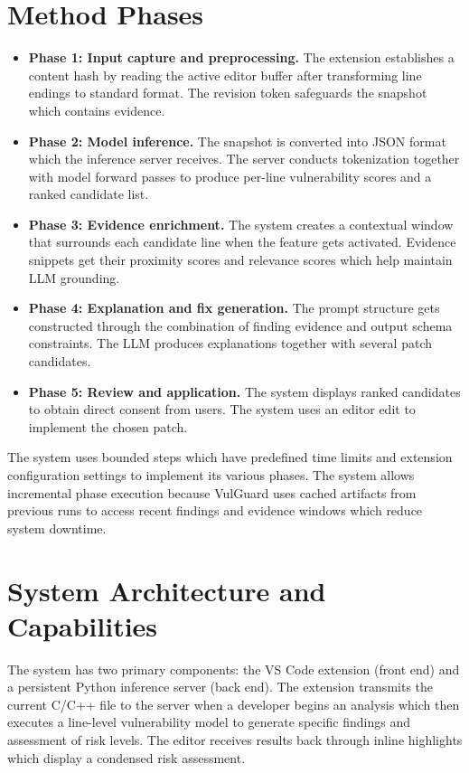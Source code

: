 \section{Method Phases} 
\begin{itemize} 
\item \textbf{Phase 1: Input capture and preprocessing.} The extension establishes a content hash by reading the active editor buffer after transforming line endings to standard format. The revision token safeguards the snapshot which contains evidence.
\item \textbf{Phase 2: Model inference.} The snapshot is converted into JSON format which the inference server receives. The server conducts tokenization together with model forward passes to produce per-line vulnerability scores and a ranked candidate list.
\item \textbf{Phase 3: Evidence enrichment.} The system creates a contextual window that surrounds each candidate line when the feature gets activated. Evidence snippets get their proximity scores and relevance scores which help maintain LLM grounding.
\item \textbf{Phase 4: Explanation and fix generation.} The prompt structure gets constructed through the combination of finding evidence and output schema constraints. The LLM produces explanations together with several patch candidates.
\item \textbf{Phase 5: Review and application.} The system displays ranked candidates to obtain direct consent from users. The system uses an editor edit to implement the chosen patch.
\end{itemize}

The system uses bounded steps which have predefined time limits and extension configuration settings to implement its various phases. The system allows incremental phase execution because VulGuard uses cached artifacts from previous runs to access recent findings and evidence windows which reduce system downtime.

\section{System Architecture and Capabilities}
The system has two primary components: the VS Code extension (front end) and a persistent Python inference server (back end). The extension transmits the current C/C++ file to the server when a developer begins an analysis which then executes a line-level vulnerability model to generate specific findings and assessment of risk levels. The editor receives results back through inline highlights which display a condensed risk assessment.

